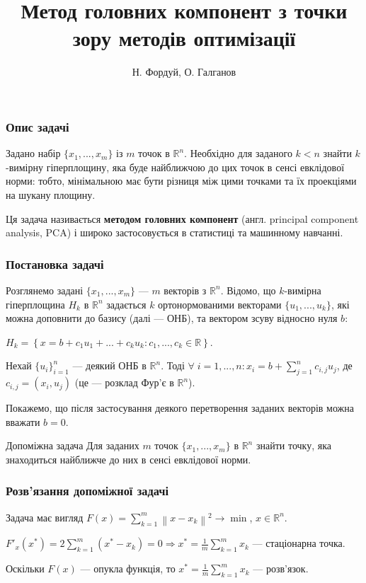 \documentclass[10pt,pdf]{beamer}
\title{Метод головних компонент з точки зору методів оптимізації}
\author{Н. Фордуй, О. Галганов}
\date{}
\newcommand{\norm}[1]{\left\lVert#1\right\rVert} %
\newcommand{\dotprod}[2]{\left(#1, #2\right)} %
\begin{document}
    \begin{frame}
        \titlepage
    \end{frame}
    \begin{frame}
        \frametitle{Опис задачі}
        Задано набір $\{{x_1}, ..., {x_m}\}$ із $m$ точок в $\mathbb{R}^n$.
        Необхідно для заданого $k < n$ знайти $k$-вимірну гіперплощину, яка буде найближчою
        до цих точок в сенсі евклідової норми: тобто, мінімальною має бути
        різниця між цими точками та їх проекціями на шукану площину.
        
        Ця задача називається \textbf{методом головних компонент} (англ. principal component analysis, PCA)
        і широко застосовується в статистиці та машинному навчанні.
    \end{frame}
    \begin{frame}
        \frametitle{Постановка задачі}
        Розглянемо задані $\{{x_1}, ..., {x_m}\}$ --- $m$ векторів з $\mathbb{R}^n$.
        Відомо, що $k$-вимірна гіперплощина $H_k$ в $\mathbb{R}^n$ задається $k$ ортонормованими
        векторами $\{u_1, ..., u_k\}$, які можна доповнити до базису (далі --- ОНБ), та вектором зсуву відносно нуля
        ${b}$: 
        
        $H_k = \left\{ x = b + c_1 u_1 + ... + c_k u_k : c_1,...,c_k \in \mathbb{R}\right\}$.

        Нехай $\{{u_i}\}_{i=1}^n$ --- деякий ОНБ в $\mathbb{R}^n$. Тоді
        $\forall \; i =1,...,n:{x_i} = {b} + \sum\limits_{j=1}^nc_{i, j}u_j$, де $c_{i, j} = \dotprod{x_i}{u_j}$
        (це --- розклад Фур'є в $\mathbb{R}^n$).

        Покажемо, що після застосування деякого перетворення заданих векторів можна
        вважати $b = 0$.
        \begin{block}{Допоміжна задача}
            Для заданих $m$ точок $\{{x_1}, ..., {x_m}\}$ в $\mathbb{R}^n$
            знайти точку, яка знаходиться найближче до них в сенсі 
            евклідової норми.
        \end{block}
    \end{frame}
    \begin{frame}
        \frametitle{Розв'язання допоміжної задачі}
        Задача має вигляд $F(x) = \sum\limits_{k=1}^m \norm{x - x_k}^2 \to \min$, $x \in \mathbb{R}^n$.
        
        $F'_{x} (x^\ast) = 2 \sum\limits_{k=1}^m (x^\ast - x_k) = 0 \Rightarrow x^\ast = \frac{1}{m} \sum\limits_{k=1}^m x_k$ --- стаціонарна точка.

        Оскільки $F(x)$ --- опукла функція, то $x^\ast = \frac{1}{m} \sum\limits_{k=1}^m x_k$ --- розв'язок.
    \end{frame}
\end{document}
